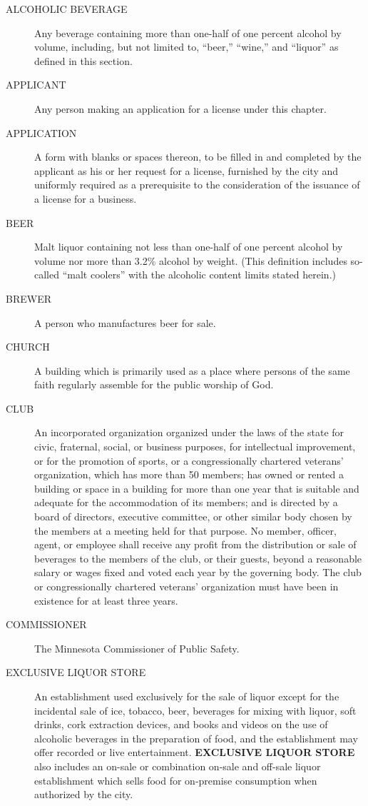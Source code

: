 \begin{description}
    \item[ALCOHOLIC BEVERAGE] Any beverage containing more than one-half of one percent alcohol by volume, including, but not limited to, “beer,” “wine,” and “liquor” as defined in this section.
    \item[APPLICANT] Any person making an application for a license under this chapter.
    \item[APPLICATION] A form with blanks or spaces thereon, to be filled in and completed by the applicant as his or her request for a license, furnished by the city and uniformly required as a prerequisite to the consideration of the issuance of a license for a business.
    \item[BEER] Malt liquor containing not less than one-half of one percent alcohol by volume nor more than 3.2\% alcohol by weight. (This definition includes so-called “malt coolers” with the alcoholic content limits stated herein.)
    \item[BREWER] A person who manufactures beer for sale.
    \item[CHURCH] A building which is primarily used as a place where persons of the same faith regularly assemble for the public worship of God.
    \item[CLUB] An incorporated organization organized under the laws of the state for civic, fraternal, social, or business purposes, for intellectual improvement, or for the promotion of sports, or a congressionally chartered veterans’ organization, which has more than 50 members; has owned or rented a building or space in a building for more than one year that is suitable and adequate for the accommodation of its members; and is directed by a board of directors, executive committee, or other similar body chosen by the members at a meeting held for that purpose.  No member, officer, agent, or employee shall receive any profit from the distribution or sale of beverages to the members of the club, or their guests, beyond a reasonable salary or wages fixed and voted each year by the governing body.  The club or congressionally chartered veterans’ organization must have been in existence for at least three years.
    \item[COMMISSIONER] The Minnesota Commissioner of Public Safety.
    \item[EXCLUSIVE LIQUOR STORE] An establishment used exclusively for the sale of liquor except for the incidental sale of ice, tobacco, beer, beverages for mixing with liquor, soft drinks, cork extraction devices, and books and videos on the use of alcoholic beverages in the preparation of food, and the establishment may offer recorded or live entertainment.  \textbf{EXCLUSIVE LIQUOR STORE} also includes an on-sale or combination on-sale and off-sale liquor establishment which sells food for on-premise consumption when authorized by the city.

\end{description}
